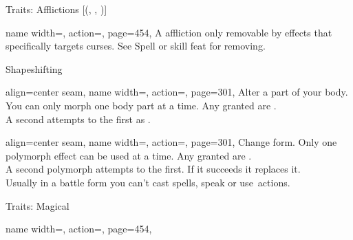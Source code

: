 \begin{PageFrontLandscape}
\begin{TablesHalf}{\frontTableHeight}
\begin{Table}{Traits: Afflictions }[{(, , )}]
\begin{entry}{}{%
                name width=\conditionLength,%
                action=\Curse,
                page=454,
            }
                A affliction only removable by effects that specifically targets curses. \hfill
                See Spell  or  skill feat for removing.
            \end{entry}
        \end{Table}
        \TableSpace
        \begin{Table}{Shapeshifting}
            \begin{entry}{}{%
                align=center seam,
                name width=\conditionLength,%
                action=\Morph,
                page=301,
            }
                Alter a part of your body. You can only morph one body part at a time.
                Any  granted are \Magical. \hfill
                \\
                A second attempts to  the first as \Polymorph.\hfill
            \end{entry}
            \begin{entry}{}{%
                align=center seam,
                name width=\conditionLength,%
                action=\Polymorph,
                page=301,
            }
                Change form.
                Only one polymorph effect can be used at a time.
                Any  granted are \Magical. \hfill
                \\
                A second polymorph attempts to  the first.
                If it succeeds it replaces it. \\
                Usually in a battle form you can't cast spells, speak or use \Manipulate\,actions. \hfill
            \end{entry}
        \end{Table}
    \end{TablesHalf}%
    \begin{TablesHalf}{\frontTableHeight}
        \renewcommand{\TableSpace}{\\\vspace{2mm}\\}%
        \begin{Table}{Traits: Magical}
            \begin{entry}{}{%
                name width=\conditionLength,%
                action=\Death,
                page=454,
            }

\end{entry}
\end{Table}
\end{TablesHalf}
\end{PageFrontLandscape}
